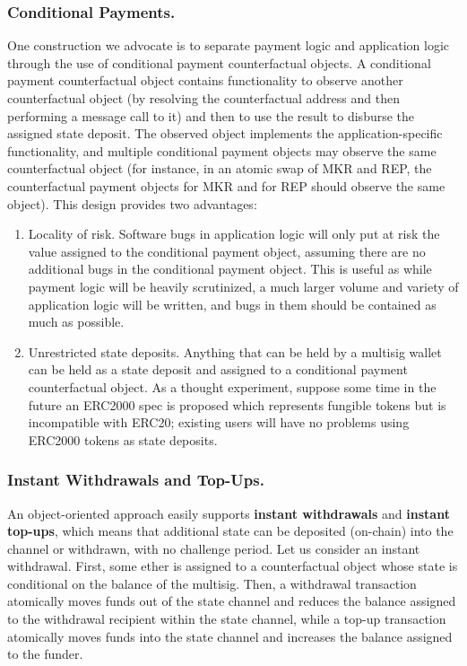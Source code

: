 \documentclass[prb,floatfix,reprint,nofootinbib,amsmath,amssymb,epsfig,pre,floats,letterpaper,groupedaffiliation,tightenlines,allcolors=blue,11pt]{revtex4}
\theoremstyle{definition}
\theoremstyle{definition}
\theoremstyle{definition}
\begin{document}
\subsubsection{Conditional Payments.} One construction we advocate is to separate payment logic and application logic through the use of conditional payment counterfactual objects. A conditional payment counterfactual object contains functionality to observe another counterfactual object (by resolving the counterfactual address and then performing a message call to it) and then to use the result to disburse the assigned state deposit. The observed object implements the application-specific functionality, and multiple conditional payment objects may observe the same counterfactual object (for instance, in an atomic swap of MKR and REP, the counterfactual payment objects for MKR and for REP should observe the same object). This design provides two advantages:

\begin{enumerate}
    \item Locality of risk. Software bugs in application logic will only put at risk the value assigned to the conditional payment object, assuming there are no additional bugs in the conditional payment object. This is useful as while payment logic will be heavily scrutinized, a much larger volume and variety of application logic will be written, and bugs in them should be contained as much as possible.
    \item Unrestricted state deposits. Anything that can be held by a multisig wallet can be held as a state deposit and assigned to a conditional payment counterfactual object. As a thought experiment, suppose some time in the future an ERC2000 spec is proposed which represents fungible tokens but is incompatible with ERC20; existing users will have no problems using ERC2000 tokens as state deposits.
\end{enumerate}

\subsubsection{Instant Withdrawals and Top-Ups.} An object-oriented approach easily supports \textbf{instant withdrawals} and \textbf{instant top-ups}, which means that additional state can be deposited (on-chain) into the channel or withdrawn, with no challenge period. Let us consider an instant withdrawal. First, some ether is assigned to a counterfactual object whose state is conditional on the balance of the multisig. Then, a withdrawal transaction atomically moves funds out of the state channel and reduces the balance assigned to the withdrawal recipient within the state channel, while a top-up transaction atomically moves funds into the state channel and increases the balance assigned to the funder.
\end{document}
